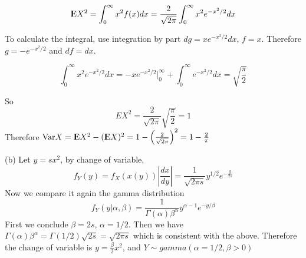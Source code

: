 \documentclass[12pt]{article}
\begin{document}
 $${\rm I\kern-.3em E} X^2 = \int^{\infty}_{0} x^2f(x) dx =  \frac{2}{\sqrt{2\pi}} \int^{\infty}_{0} x^2 e^{-x^2/2} dx$$
 
To calculate the integral, use integration by part $dg = x e^{-x^2/2}dx$, $f = x$. Therefore $g = -e^{-x^2/2}$ and $df=dx$. 

$$\int^{\infty}_{0} x^2 e^{-x^2/2} dx = -xe^{-x^2/2}|^{\infty}_{0} + \int^{\infty}_{0} e^{-x^2/2} dx = \sqrt{\frac{\pi}{2}}$$

So $$EX^2 = \frac{2}{\sqrt{2\pi}}  \sqrt{\frac{\pi}{2}} = 1$$
Therefore $\mathrm{Var} X = {\rm I\kern-.3em E} X^2 - ({\rm I\kern-.3em E} X)^2 = 1 - \left( \frac{2}{\sqrt{2\pi}}\right)^2 = 1 - \frac{2}{\pi}$ 

(b) Let $y=sx^2$, by change of variable,
$$ f_Y(y) = f_X(x(y)) \left| \frac{dx}{dy} \right| = \frac{1}{\sqrt{2\pi s}} y^{1/2} e^{-\frac{y}{2s}}$$
Now we compare it again the gamma distribution $$ f_Y(y|\alpha, \beta) = \frac{1}{\Gamma(\alpha)\beta^{\alpha}} y^{\alpha - 1} e^{-y/\beta}$$
First we conclude $\beta = 2s$, $\alpha = 1/2$. Then we have $\Gamma(\alpha)\beta^{\alpha} = \Gamma(1/2)\sqrt{2s} = \sqrt{2\pi s}$ which is consistent with the above. Therefore the change of variable is $y = \frac{\beta}{2} x^2$, and $Y \sim gamma(\alpha=1/2, \beta > 0)$
\end{document}
